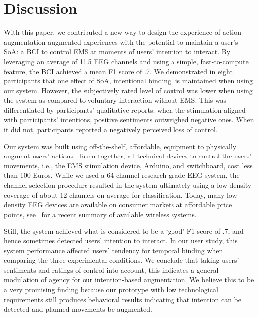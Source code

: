 \section{Discussion}
With this paper, we contributed a new way to design the experience of action augmentation augmented experiences with the potential to maintain a user's SoA: a BCI to control EMS at moments of users' intention to interact. By leveraging an average of 11.5 EEG channels and using a simple, fast-to-compute feature, the BCI achieved a mean F1 score of .7. We demonstrated in eight participants that one effect of SoA, intentional binding, is maintained when using our system. However, the subjectively rated level of control was lower when using the system as compared to voluntary interaction without EMS. This was differentiated by participants' qualitative reports: when the stimulation aligned with participants' intentions, positive sentiments outweighed negative ones. When it did not, participants reported a negatively perceived loss of control.

Our system was built using off-the-shelf, affordable, equipment to physically augment users' actions. Taken together, all technical devices to control the users' movements, i.e., the EMS stimulation device, Arduino, and switchboard, cost less than 100 Euros. While we used a 64-channel research-grade EEG system, the channel selection procedure resulted in the system ultimately using a low-density coverage of about 12 channels on average for classification. Today, many low-density EEG devices are available on consumer markets at affordable price points, see~\citet{Niso2023-ce} for a recent summary of available wireless systems. 

Still, the system achieved what is considered to be a `good' F1 score of .7, and hence sometimes detected users' intention to interact. In our user study, this system performance affected users' tendency for temporal binding when comparing the three experimental conditions. We conclude that taking users' sentiments and ratings of control into account, this indicates a general modulation of agency for our intention-based augmentation. We believe this to be a very promising finding because our prototype with low technological requirements still produces behavioral results indicating that intention can be detected and planned movements be augmented.

